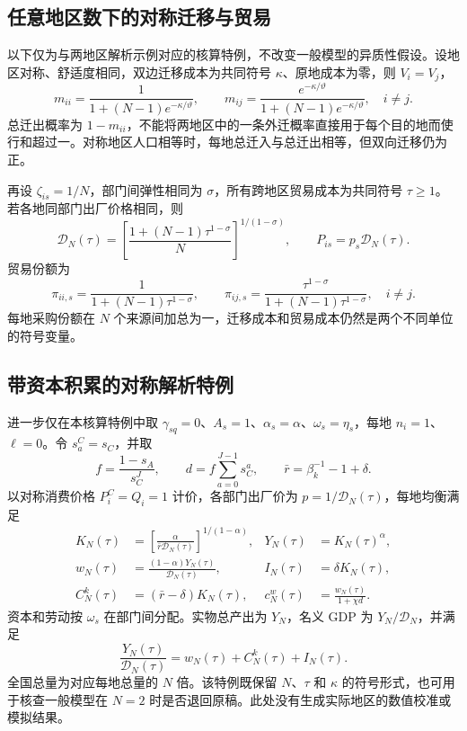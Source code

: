\documentclass[UTF8,a4paper,zihao=-4,fontset=windows]{ctexart}
\numberwithin{equation}{section}
\newcommand{\pc}{P^{C}}
\newcommand{\invp}{Q}
\begin{document}
\subsection{任意地区数下的对称迁移与贸易}
以下仅为与两地区解析示例对应的核算特例，不改变一般模型的异质性假设。设地区对称、舒适度相同，双边迁移成本为共同符号 $\kappa$、原地成本为零，则 $V_i=V_j$，
\begin{equation}
 m_{ii}=\frac{1}{1+(N-1)e^{-\kappa/\vartheta}},\qquad
 m_{ij}=\frac{e^{-\kappa/\vartheta}}{1+(N-1)e^{-\kappa/\vartheta}},\quad i\neq j.
 \label{eq:lg-symmetric-migration}
\end{equation}
总迁出概率为 $1-m_{ii}$，不能将两地区中的一条外迁概率直接用于每个目的地而使行和超过一。对称地区人口相等时，每地总迁入与总迁出相等，但双向迁移仍为正。

再设 $\zeta_{is}=1/N$，部门间弹性相同为 $\sigma$，所有跨地区贸易成本为共同符号 $\tau\geq1$。若各地同部门出厂价格相同，则
\begin{equation}
 \mathcal D_N(\tau)=\left[\frac{1+(N-1)\tau^{1-\sigma}}{N}\right]^{1/(1-\sigma)},
 \qquad P_{is}=p_s\mathcal D_N(\tau).
 \label{eq:lg-symmetric-trade-wedge}
\end{equation}
贸易份额为
\begin{equation}
 \pi_{ii,s}=\frac{1}{1+(N-1)\tau^{1-\sigma}},\qquad
 \pi_{ij,s}=\frac{\tau^{1-\sigma}}{1+(N-1)\tau^{1-\sigma}},\quad i\neq j.
\end{equation}
每地采购份额在 $N$ 个来源间加总为一，迁移成本和贸易成本仍然是两个不同单位的符号变量。

\subsection{带资本积累的对称解析特例}
进一步仅在本核算特例中取 $\gamma_{sq}=0$、$A_s=1$、$\alpha_s=\alpha$、$\omega_s=\eta_s$，每地 $n_i=1$、$\ell=0$。令 $s^C_a=s_C$，并取
\begin{equation}
 f=\frac{1-s_A}{s_C^J},\qquad
 d=f\sum_{a=0}^{J-1}s_C^a,\qquad
 \bar r=\beta_k^{-1}-1+\delta.
\end{equation}
以对称消费价格 $\pc_i=\invp_i=1$ 计价，各部门出厂价为 $p=1/\mathcal D_N(\tau)$，每地均衡满足
\begin{align}
 K_N(\tau)&=\left[\frac{\alpha}{\bar r\mathcal D_N(\tau)}\right]^{1/(1-\alpha)},&
 Y_N(\tau)&=K_N(\tau)^\alpha,\\
 w_N(\tau)&=\frac{(1-\alpha)Y_N(\tau)}{\mathcal D_N(\tau)},&
 I_N(\tau)&=\delta K_N(\tau),\\
 C^k_N(\tau)&=(\bar r-\delta)K_N(\tau),&
 c^w_N(\tau)&=\frac{w_N(\tau)}{1+\chi d}.
 \label{eq:lg-symmetric-capital}
\end{align}
资本和劳动按 $\omega_s$ 在部门间分配。实物总产出为 $Y_N$，名义 GDP 为 $Y_N/\mathcal D_N$，并满足
\begin{equation}
 \frac{Y_N(\tau)}{\mathcal D_N(\tau)}
 =w_N(\tau)+C^k_N(\tau)+I_N(\tau).
\end{equation}
全国总量为对应每地总量的 $N$ 倍。该特例既保留 $N$、$\tau$ 和 $\kappa$ 的符号形式，也可用于核查一般模型在 $N=2$ 时是否退回原稿。此处没有生成实际地区的数值校准或模拟结果。
\end{document}
